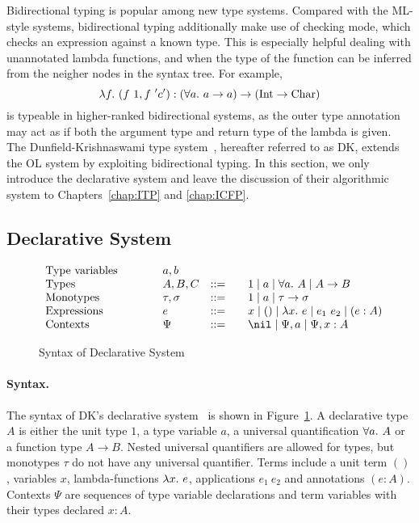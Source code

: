 Bidirectional typing is popular among new type systems.
Compared with the ML-style systems,
bidirectional typing additionally make use of checking mode,
which checks an expression against a known type.
This is especially helpful dealing with unannotated lambda functions,
and when the type of the function can be inferred from the neigher nodes in the syntax tree.
For example,
$$\lam[f] (f~1, f~'c') : (\all a \to a) \to (\text{Int} \to \text{Char})$$
is typeable in higher-ranked bidirectional systems,
as the outer type annotation may act as if both the argument type and return type
of the lambda is given.
The Dunfield-Krishnaswami type system~\citep{dunfield2013complete},
hereafter referred to as DK,
extends the OL system by exploiting bidirectional typing.
In this section, we only introduce the declarative system
and leave the discussion of their algorithmic system to
Chapters~\ref{chap:ITP} and \ref{chap:ICFP}.

\subsection{Declarative System}\label{subsec:dk:decl}

\begin{figure}[t]
\[
\begin{array}{l@{\qquad}lcl}
\text{Type variables}\qquad&a, b
\\
\text{Types}\qquad&A, B, C &::=&\quad 1 \mid a \mid \all A \mid A\to B\\
\text{Monotypes}\qquad&\tau,\sigma &::=&\quad 1 \mid a \mid \tau\to \sigma
\\
\text{Expressions}\qquad&e &::=&\quad x \mid () \mid \lam e \mid e_1~e_2 \mid (e:A)
\\
\text{Contexts}\qquad&\Psi &::=&\quad \nil \mid \Psi, a \mid \Psi, x:A
\end{array}
\]
\caption{Syntax of Declarative System}\label{fig:decl:syntax}
\end{figure}

\paragraph{Syntax.}
The syntax of DK's declarative system~\citep{dunfield2013complete} is shown in Figure~\ref{fig:decl:syntax}.
A declarative type $A$ is either the unit type $1$, a type variable $a$,
a universal quantification $\all A$ or a function type $A \to B$.
Nested universal quantifiers are allowed for types,
but monotypes $\tau$ do not have any universal quantifier.
Terms include a unit term $()$, variables $x$, lambda-functions $\lam e$,
applications $e_1~e_2$ and annotations $(e:A)$.
Contexts $\Psi$ are sequences of type variable declarations and
term variables with their types declared $x:A$.


